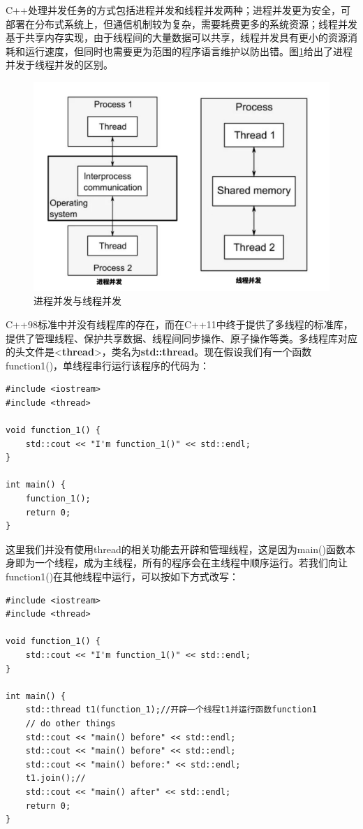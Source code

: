 C++处理并发任务的方式包括进程并发和线程并发两种；进程并发更为安全，可部署在分布式系统上，但通信机制较为复杂，需要耗费更多的系统资源；线程并发基于共享内存实现，由于线程间的大量数据可以共享，线程并发具有更小的资源消耗和运行速度，但同时也需要更为范围的程序语言维护以防出错。图\ref{fig.concurrenncy}给出了进程并发于线程并发的区别。
\begin{figure}[htbp]
	\centering
	\includegraphics[scale=0.5]{Concurrency}
	\caption{进程并发与线程并发}
	\label{fig.concurrenncy}
\end{figure}
C++98标准中并没有线程库的存在，而在C++11中终于提供了多线程的标准库，提供了管理线程、保护共享数据、线程间同步操作、原子操作等类。多线程库对应的头文件是<\textbf{thread}>，类名为\textbf{std::thread}。现在假设我们有一个函数function1()，单线程串行运行该程序的代码为：\\
\begin{lstlisting}
#include <iostream>
#include <thread>

void function_1() {
	std::cout << "I'm function_1()" << std::endl;
}

int main() {
	function_1();
	return 0;
}
\end{lstlisting}
这里我们并没有使用thread的相关功能去开辟和管理线程，这是因为main()函数本身即为一个线程，成为主线程，所有的程序会在主线程中顺序运行。若我们向让function1()在其他线程中运行，可以按如下方式改写：\\
\begin{lstlisting}
#include <iostream>
#include <thread>

void function_1() {
	std::cout << "I'm function_1()" << std::endl;
}

int main() {
	std::thread t1(function_1);//开辟一个线程t1并运行函数function1
	// do other things
	std::cout << "main() before" << std::endl;
	std::cout << "main() before" << std::endl;
	std::cout << "main() before:" << std::endl;
	t1.join();//
	std::cout << "main() after" << std::endl;
	return 0;
}
\end{lstlisting}

